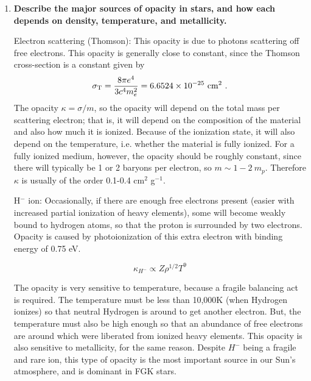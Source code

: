 \begin{enumerate}
\item \textbf{Describe the major sources of opacity in stars, and how each depends on density,
      temperature, and metallicity.}
      
      Electron scattering (Thomson): This opacity is due to photons scattering off free electrons. This opacity is generally close to constant, since the Thomson cross-section is a constant given by
      \begin{equation}
      \sigma_{\rm T} = \frac{8 \pi e^4}{3 c^4 m_e^2} = 6.6524\times 10^{-25}~{\rm cm}^2\,\, .
      \end{equation}
      The opacity $\kappa = \sigma / m$, so the opacity will depend on the total mass per scattering electron; that is, it will depend on the composition of the material and also how much it is ionized. Because of the ionization state, it will also depend on the temperature, i.e. whether the material is fully ionized. For a fully ionized medium, however, the opacity should be roughly constant, since there will typically be 1 or 2 baryons per electron, so $m \sim 1-2~m_p$. Therefore $\kappa$ is usually of the order 0.1-0.4 cm$^2$ g$^{-1}$.
      
      H$^-$ ion: Occasionally, if there are enough free electrons present (easier with increased partial ionization of heavy elements), some will become weakly bound to hydrogen atoms, so that the proton is surrounded by two electrons. Opacity is caused by photoionization of this extra electron with binding energy of 0.75 eV. 
      
      \begin{equation}
      \kappa_{H^{-}} \propto Z \rho^{1/2} T^{9}
      \end{equation}
      
      The opacity is very sensitive to temperature, because a fragile balancing act is required. The temperature must be less than 10,000K (when Hydrogen ionizes) so that neutral Hydrogen is around to get another electron. But, the temperature must also be high enough so that an abundance of free electrons are around which were liberated from ionized heavy elements. This opacity is also sensitive to metallicity, for the same reason. 
      Despite $H^{-}$ being a fragile and rare ion, this type of opacity is the most important source in our Sun's atmosphere, and is dominant in FGK stars.
      
\end{enumerate}


